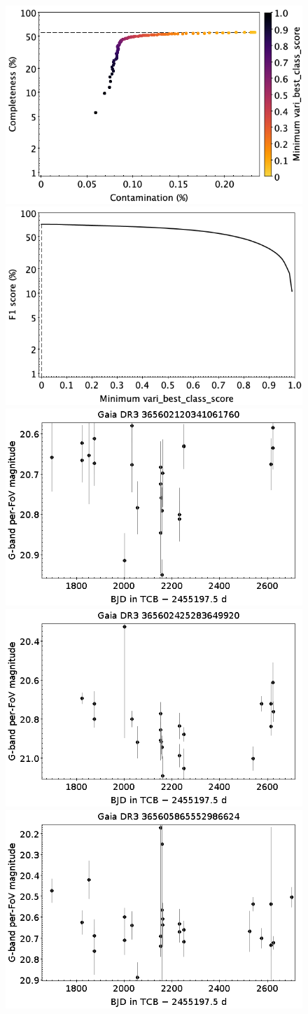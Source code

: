 \documentclass[longauth]{aa}
\begin{document}
\begin{appendix}
\begin{figure}
\centering
{} \includegraphics[width=0.45\hsize]{figures/appendix/GALAXY_ALL_cls_scc.png}  
\hspace{2mm}
 \includegraphics[width=0.45\hsize]{figures/appendix/GALAXY_ALL_cls_sf1.png} \\ 
\vspace{4mm}
 \includegraphics[width=0.45\hsize]{figures/appendix/GALAXY-97.png}  
\hspace{2mm}
 \includegraphics[width=0.45\hsize]{figures/appendix/GALAXY-98.png} \\
\vspace{4mm}
 \includegraphics[width=0.45\hsize]{figures/appendix/GALAXY-99.png}  

\end{figure}
\end{appendix}
\end{document}
